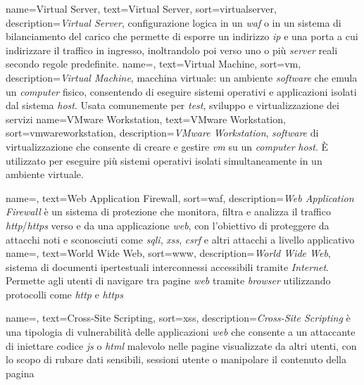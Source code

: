  {
    name=Virtual Server,
    text=Virtual Server,
    sort=virtualserver,
    description={\emph{Virtual Server}, configurazione logica in un \emph{\gls{waf}} o in un sistema di bilanciamento del carico che permette di esporre un indirizzo \emph{\gls{ip}} e una porta a cui indirizzare il traffico in ingresso, inoltrandolo poi verso uno o più \emph{server} reali secondo regole predefinite.}
}
 {
    name=,
    text=Virtual Machine,
    sort=vm,
    description={\emph{Virtual Machine}, macchina virtuale: un ambiente \emph{software} che emula un \emph{computer} fisico, consentendo di eseguire sistemi operativi e applicazioni isolati dal sistema \emph{host}. Usata comunemente per \emph{test}, sviluppo e virtualizzazione dei servizi}
}
 {
    name=VMware Workstation,
    text=VMware Workstation,
    sort=vmwareworkstation,
    description={\emph{VMware Workstation}, \emph{software} di virtualizzazione che consente di creare e gestire \emph{\gls{vm}} su un \emph{computer} \emph{host}. È utilizzato per eseguire più sistemi operativi isolati simultaneamente in un ambiente virtuale.}
}

 {
    name=,
    text=Web Application Firewall,
    sort=waf,
    description={\emph{Web Application Firewall} è un sistema di protezione che monitora, filtra e analizza il traffico \emph{\gls{http}}/\emph{\gls{https}} verso e da una applicazione \emph{web}, con l'obiettivo di proteggere da attacchi noti e sconosciuti come \emph{\gls{sqli}}, \emph{\gls{xss}}, \emph{\gls{csrf}} e altri attacchi a livello applicativo}
}
 {
    name=,
    text=World Wide Web,
    sort=www,
    description={\emph{World Wide Web}, sistema di documenti ipertestuali interconnessi accessibili tramite \emph{Internet}. Permette agli utenti di navigare tra pagine \emph{web} tramite \emph{browser} utilizzando protocolli come \emph{\gls{http}} e \emph{\gls{https}}}
}

 {
    name=,
    text=Cross-Site Scripting,
    sort=xss,
    description={\emph{Cross-Site Scripting} è una tipologia di vulnerabilità delle applicazioni \emph{web} che consente a un attaccante di iniettare codice \emph{\gls{js}} o \emph{\gls{html}} malevolo nelle pagine visualizzate da altri utenti, con lo scopo di rubare dati sensibili, sessioni utente o manipolare il contenuto della pagina}
}


